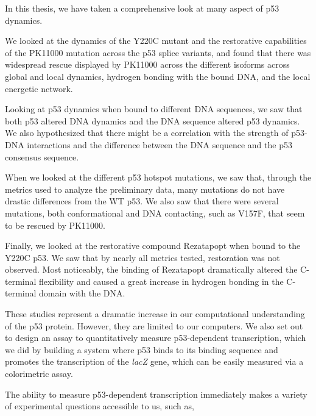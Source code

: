 In this thesis, we have taken a comprehensive look at many aspect of p53 dynamics.

We looked at the dynamics of the Y220C mutant and the restorative capabilities of the PK11000 mutation across the p53 splice variants, and found that there was widespread rescue displayed by PK11000 across the different isoforms across global and local dynamics, hydrogen bonding with the bound DNA, and the local energetic network.

Looking at p53 dynamics when bound to different DNA sequences, we saw that both p53 altered DNA dynamics and the DNA sequence altered p53 dynamics. We also hypothesized that there might be a correlation with the strength of p53-DNA interactions and the difference between the DNA sequence and the p53 consensus sequence.

When we looked at the different p53 hotspot mutations, we saw that, through the metrics used to analyze the preliminary data, many mutations do not have drastic differences from the WT p53. We also saw that there were several mutations, both conformational and DNA contacting, such as V157F, that seem to be rescued by PK11000.

Finally, we looked at the restorative compound Rezatapopt when bound to the Y220C p53. We saw that by nearly all metrics tested, restoration was not observed. Most noticeably, the binding of Rezatapopt dramatically altered the C-terminal flexibility and caused a great increase in hydrogen bonding in the C-terminal domain with the DNA.

These studies represent a dramatic increase in our computational understanding of the p53 protein. However, they are limited to our computers. We also set out to design an assay to quantitatively measure p53-dependent transcription, which we did by building a system where p53 binds to its binding sequence and promotes the transcription of the \textit{lacZ} gene, which can be easily measured via a colorimetric assay.

The ability to measure p53-dependent transcription immediately makes a variety of experimental questions accessible to us, such as,

